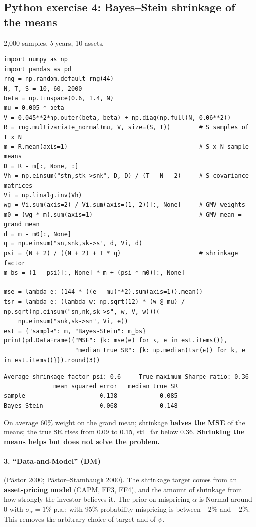 \documentclass[11pt,a4paper]{report}
\begin{document}
\subsection*{Python exercise 4: Bayes--Stein shrinkage of the means}
2{,}000 samples, 5 years, 10 assets.
\begin{lstlisting}
import numpy as np
import pandas as pd
rng = np.random.default_rng(44)
N, T, S = 10, 60, 2000
beta = np.linspace(0.6, 1.4, N)
mu = 0.005 * beta
V = 0.045**2*np.outer(beta, beta) + np.diag(np.full(N, 0.06**2))
R = rng.multivariate_normal(mu, V, size=(S, T))        # S samples of T x N
m = R.mean(axis=1)                                     # S x N sample means
D = R - m[:, None, :]
Vh = np.einsum("stn,stk->snk", D, D) / (T - N - 2)     # S covariance matrices
Vi = np.linalg.inv(Vh)
wg = Vi.sum(axis=2) / Vi.sum(axis=(1, 2))[:, None]     # GMV weights
m0 = (wg * m).sum(axis=1)                              # GMV mean = grand mean
d = m - m0[:, None]
q = np.einsum("sn,snk,sk->s", d, Vi, d)
psi = (N + 2) / ((N + 2) + T * q)                      # shrinkage factor
m_bs = (1 - psi)[:, None] * m + (psi * m0)[:, None]

mse = lambda e: (144 * ((e - mu)**2).sum(axis=1)).mean()
tsr = lambda e: (lambda w: np.sqrt(12) * (w @ mu) / np.sqrt(np.einsum("sn,nk,sk->s", w, V, w)))(
    np.einsum("snk,sk->sn", Vi, e))
est = {"sample": m, "Bayes-Stein": m_bs}
print(pd.DataFrame({"MSE": {k: mse(e) for k, e in est.items()},
                    "median true SR": {k: np.median(tsr(e)) for k, e in est.items()}}).round(3))
\end{lstlisting}
\begin{lstlisting}[style=out]
Average shrinkage factor psi: 0.6     True maximum Sharpe ratio: 0.36
              mean squared error   median true SR
sample                     0.138            0.085
Bayes-Stein                0.068            0.148
\end{lstlisting}
On average 60\% weight on the grand mean; shrinkage \textbf{halves the MSE} of the
means; the true SR rises from 0.09 to 0.15, still far below 0.36.
\textbf{Shrinking the means helps but does not solve the problem.}

\paragraph{3. ``Data-and-Model'' (DM)} (P\'astor 2000; P\'astor--Stambaugh 2000).
The shrinkage target comes from an \textbf{asset-pricing model} (CAPM, FF3, FF4),
and the amount of shrinkage from how strongly the investor believes it. The prior
on mispricing $\alpha$ is Normal around 0 with $\sigma_\alpha=1\%$ p.a.: with 95\%
probability mispricing is between $-2\%$ and $+2\%$. This removes the arbitrary
choice of target and of $\psi$.
\end{document}
